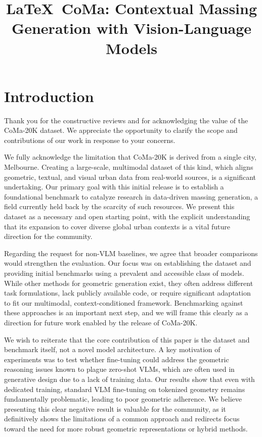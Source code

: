 \documentclass[10pt,twocolumn,letterpaper]{article}
\begin{document}
\title{\LaTeX\ CoMa: Contextual Massing Generation with Vision-Language Models}  %

\maketitle
\thispagestyle{empty}
\appendix

\section{Introduction}

Thank you for the constructive reviews and for acknowledging the value of the CoMa-20K dataset. We appreciate the opportunity to clarify the scope and contributions of our work in response to your concerns.

We fully acknowledge the limitation that CoMa-20K is derived from a single city, Melbourne. Creating a large-scale, multimodal dataset of this kind, which aligns geometric, textual, and visual urban data from real-world sources, is a significant undertaking. Our primary goal with this initial release is to establish a foundational benchmark to catalyze research in data-driven massing generation, a field currently held back by the scarcity of such resources. We present this dataset as a necessary and open starting point, with the explicit understanding that its expansion to cover diverse global urban contexts is a vital future direction for the community.

Regarding the request for non-VLM baselines, we agree that broader comparisons would strengthen the evaluation. Our focus was on establishing the dataset and providing initial benchmarks using a prevalent and accessible class of models. While other methods for geometric generation exist, they often address different task formulations, lack publicly available code, or require significant adaptation to fit our multimodal, context-conditioned framework. Benchmarking against these approaches is an important next step, and we will frame this clearly as a direction for future work enabled by the release of CoMa-20K.

We wish to reiterate that the core contribution of this paper is the dataset and benchmark itself, not a novel model architecture. A key motivation of experiments was to test whether fine-tuning could address the geometric reasoning issues known to plague zero-shot VLMs, which are often used in generative design due to a lack of training data. Our results show that even with dedicated training, standard VLM fine-tuning on tokenized geometry remains fundamentally problematic, leading to poor geometric adherence. We believe presenting this clear negative result is valuable for the community, as it definitively shows the limitations of a common approach and redirects focus toward the need for more robust geometric representations or hybrid methods.
\end{document}
